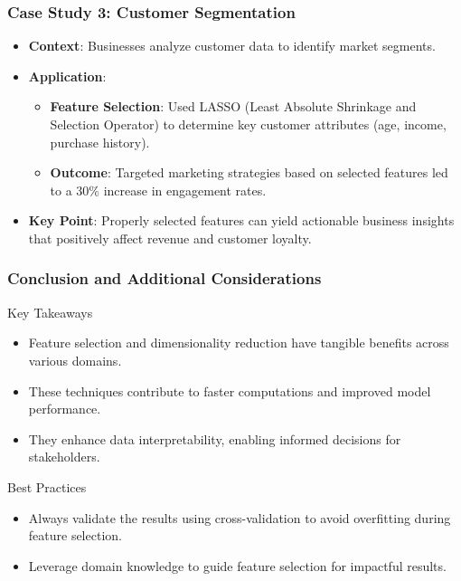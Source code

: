 \documentclass{beamer}
\begin{document}
\begin{frame}[fragile]
    \frametitle{Case Study 3: Customer Segmentation}

    \begin{itemize}
        \item \textbf{Context}: Businesses analyze customer data to identify market segments.
        \item \textbf{Application}:
            \begin{itemize}
                \item \textbf{Feature Selection}: Used LASSO (Least Absolute Shrinkage and Selection Operator) to determine key customer attributes (age, income, purchase history).
                \item \textbf{Outcome}: Targeted marketing strategies based on selected features led to a 30\% increase in engagement rates.
            \end{itemize}
        \item \textbf{Key Point}: Properly selected features can yield actionable business insights that positively affect revenue and customer loyalty.
    \end{itemize}
\end{frame}

\begin{frame}[fragile]
    \frametitle{Conclusion and Additional Considerations}

    \begin{block}{Key Takeaways}
        \begin{itemize}
            \item Feature selection and dimensionality reduction have tangible benefits across various domains.
            \item These techniques contribute to faster computations and improved model performance.
            \item They enhance data interpretability, enabling informed decisions for stakeholders.
        \end{itemize}
    \end{block}

    \begin{block}{Best Practices}
        \begin{itemize}
            \item Always validate the results using cross-validation to avoid overfitting during feature selection.
            \item Leverage domain knowledge to guide feature selection for impactful results.
        \end{itemize}
    \end{block}
\end{frame}
\end{document}
